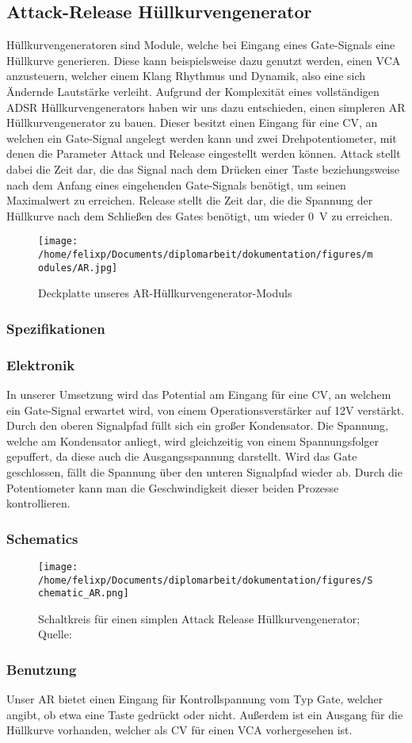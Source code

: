 \subsection{Attack-Release Hüllkurvengenerator \label{AR}}
\label{sec:org150c8ee}
Hüllkurvengeneratoren sind Module, welche bei Eingang eines Gate-Signals eine Hüllkurve generieren. Diese kann beispielsweise dazu genutzt werden, einen \ac{VCA} anzusteuern, welcher einem Klang Rhythmus und Dynamik, also eine sich Ändernde Lautstärke verleiht. Aufgrund der Komplexität eines vollständigen \ac{ADSR} Hüllkurvengenerators haben wir uns dazu entschieden, einen simpleren \ac{AR} Hüllkurvengenerator zu bauen. Dieser besitzt einen Eingang für eine \acl{CV}, an welchen ein Gate-Signal angelegt werden kann und zwei Drehpotentiometer, mit denen die Parameter Attack und Release eingestellt werden können. Attack stellt dabei die Zeit dar, die das Signal nach dem Drücken einer Taste beziehungsweise nach dem Anfang eines eingehenden Gate-Signals benötigt, um seinen Maximalwert zu erreichen. Release stellt die Zeit dar, die die Spannung der Hüllkurve nach dem Schließen des Gates benötigt, um wieder \SI{0}{\volt} zu erreichen.

\begin{figure}[htbp]
\centering
\texttt{[image: /home/felixp/Documents/diplomarbeit/dokumentation/figures/modules/AR.jpg]}
\caption{Deckplatte unseres AR-Hüllkurvengenerator-Moduls}
\end{figure}

\subsubsection{Spezifikationen}
\label{sec:org8d4fbc8}
\subsubsection{Elektronik}
\label{sec:org0b2b8be}
In unserer Umsetzung wird das Potential am Eingang für eine \acl{CV}, an welchem ein Gate-Signal erwartet wird, von einem Operationsverstärker auf 12V verstärkt. Durch den oberen Signalpfad füllt sich ein großer Kondensator. Die Spannung, welche am Kondensator anliegt, wird gleichzeitig von einem Spannungsfolger gepuffert, da diese auch die Ausgangsspannung darstellt. Wird das Gate geschlossen, fällt die Spannung über den unteren Signalpfad wieder ab. Durch die Potentiometer kann man die Geschwindigkeit dieser beiden Prozesse kontrollieren.
\subsubsection{Schematics}
\label{sec:orgfa448c3}
\begin{figure}[htbp]
\centering
\texttt{[image: /home/felixp/Documents/diplomarbeit/dokumentation/figures/Schematic\_AR.png]}
\caption{Schaltkreis für einen simplen Attack Release Hüllkurvengenerator; Quelle: \cite{synthnerd:ar}}
\end{figure}
\subsubsection{Benutzung}
\label{sec:org1c84ed6}
Unser AR bietet einen Eingang für Kontrollspannung vom Typ Gate, welcher angibt, ob etwa eine Taste gedrückt oder nicht. Außerdem ist ein Ausgang für die Hüllkurve vorhanden, welcher als \acl{CV} für einen \ac{VCA} vorhergesehen ist.
